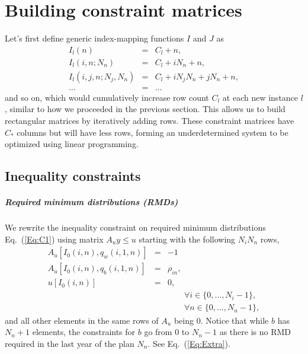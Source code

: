 \documentclass{report}[fleqn,12pt]
\begin{document}
\chapter{Building constraint matrices}
Let's first define generic index-mapping functions $I$ and $J$ as
\begin{eqnarray}
	\label{Eq:Offsets}
	I_l(n) &=& C_l + n, \nonumber \\
	I_l(i, n; N_n) &=& C_l + iN_n + n, \nonumber \\
	I_l(i, j, n; N_j, N_n) &=& C_l + iN_j N_n + jN_n +n, \\
	\ldots &=& \ldots \nonumber
\end{eqnarray}
and so on, which would cumulatively increase row count $C_l$ at each new instance $l$,
similar to how we proceeded in the previous section.
This allows us to build rectangular matrices by iteratively adding rows.
These constraint matrices have $C_*$
columns but will have less rows,
forming an underdetermined system to be optimized using linear programming.

\section{Inequality constraints}

\paragraph*{Required minimum distributions (RMDs)}
We rewrite the inequality constraint on required minimum distributions
Eq.~(\ref{Eq:C1}) using matrix $A_{u}y \le u$ starting with the following $N_iN_n$ rows, 
\begin{eqnarray}
	A_u[I_0(i, n), q_w(i, 1, n)] &=& -1 \nonumber \\
	A_u[I_0(i, n), q_b(i, 1, n)] &=& \rho_{in}, \nonumber \\
	u[I_0(i, n)] &=& 0, \\
	&&\qquad\forall i \in \{0,\ldots, N_i-1\}, \nonumber\\
	&&\qquad\forall n \in \{0,\ldots, N_n -1\},\nonumber
\end{eqnarray}
and all other elements in the same rows of $A_u$ being $0$.
Notice that while $b$ has $N_n+1$ elements, the constraints
for $b$ go from $0$ to $N_n-1$ as there is no RMD required in the last year of the plan $N_n$.
See Eq.~(\ref{Eq:Extra}).
\end{document}
